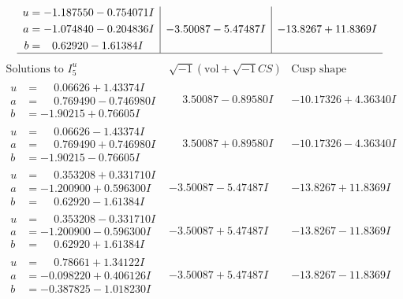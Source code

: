 \documentclass[1p]{elsarticle_modified}
\theoremstyle{definition}
\newcommand{\I}{\sqrt{-1}}
\begin{document}
$$\begin{array}{c|c|c}
\begin{aligned}
u &= -1.187550 - 0.754071 I \\
a &= -1.074840 - 0.204836 I \\
b &= \phantom{-}0.62920 - 1.61384 I\end{aligned}
 & -3.50087 - 5.47487 I & -13.8267 + 11.8369 I\\
 \hline 
 \end{array}$$\newpage$$\begin{array}{c|c|c}  
\text{Solutions to }I^u_{5}& \I (\text{vol} + \sqrt{-1}CS) & \text{Cusp shape}\\
 \hline 
\begin{aligned}
u &= \phantom{-}0.06626 + 1.43374 I \\
a &= \phantom{-}0.769490 - 0.746980 I \\
b &= -1.90215 + 0.76605 I\end{aligned}
 & \phantom{-}3.50087 - 0.89580 I & -10.17326 + 4.36340 I \\ \hline\begin{aligned}
u &= \phantom{-}0.06626 - 1.43374 I \\
a &= \phantom{-}0.769490 + 0.746980 I \\
b &= -1.90215 - 0.76605 I\end{aligned}
 & \phantom{-}3.50087 + 0.89580 I & -10.17326 - 4.36340 I \\ \hline\begin{aligned}
u &= \phantom{-}0.353208 + 0.331710 I \\
a &= -1.200900 + 0.596300 I \\
b &= \phantom{-}0.62920 - 1.61384 I\end{aligned}
 & -3.50087 - 5.47487 I & -13.8267 + 11.8369 I \\ \hline\begin{aligned}
u &= \phantom{-}0.353208 - 0.331710 I \\
a &= -1.200900 - 0.596300 I \\
b &= \phantom{-}0.62920 + 1.61384 I\end{aligned}
 & -3.50087 + 5.47487 I & -13.8267 - 11.8369 I \\ \hline\begin{aligned}
u &= \phantom{-}0.78661 + 1.34122 I \\
a &= -0.098220 + 0.406126 I \\
b &= -0.387825 - 1.018230 I\end{aligned}
 & -3.50087 + 5.47487 I & -13.8267 - 11.8369 I \\ \hline\begin{aligned}

\end{aligned}
\end{array}$$
\end{document}
